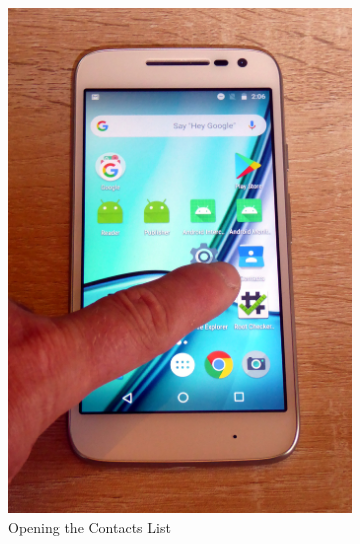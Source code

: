 \begin{figure}
	\centering
	
	\begin{subfigure}{0.49\textwidth}
	  \centering
      \includegraphics[height=0.45\textheight]{graphics/PhonePhotos/02 - BringUpContacts.jpg}
      \caption{Opening the Contacts List}
      \label{fig:OpeningContacts}
	\end{subfigure}
\hfill	
	\begin{subfigure}{0.49\textwidth}
		\centering

\end{subfigure}
\end{figure}
